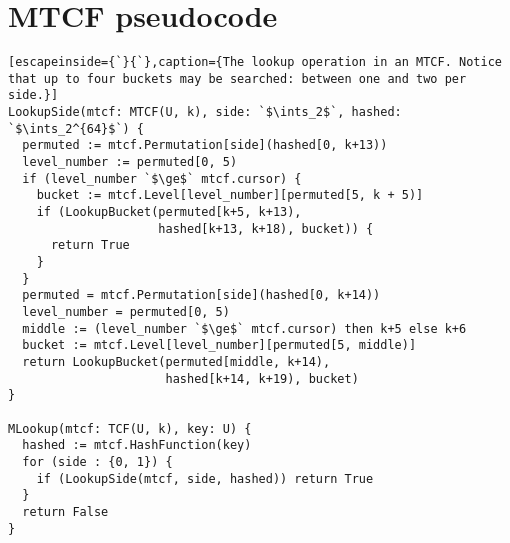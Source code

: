 \documentclass[sigconf, nonacm]{acmart}
\newcommand{\ints}{\mathbb{Z}}
\begin{document}


\pagebreak
\appendix
\section{MTCF pseudocode}
\label{mtcf-appendix}
 
\begin{lstlisting}[escapeinside={`}{`},caption={The lookup operation in an MTCF. Notice that up to four buckets may be searched: between one and two per side.}]
LookupSide(mtcf: MTCF(U, k), side: `$\ints_2$`, hashed: `$\ints_2^{64}$`) {
  permuted := mtcf.Permutation[side](hashed[0, k+13))
  level_number := permuted[0, 5)
  if (level_number `$\ge$` mtcf.cursor) {
    bucket := mtcf.Level[level_number][permuted[5, k + 5)]
    if (LookupBucket(permuted[k+5, k+13),
                     hashed[k+13, k+18), bucket)) {
      return True
    }
  }
  permuted = mtcf.Permutation[side](hashed[0, k+14))
  level_number = permuted[0, 5)
  middle := (level_number `$\ge$` mtcf.cursor) then k+5 else k+6
  bucket := mtcf.Level[level_number][permuted[5, middle)]
  return LookupBucket(permuted[middle, k+14),
                      hashed[k+14, k+19), bucket)
}

MLookup(mtcf: TCF(U, k), key: U) {
  hashed := mtcf.HashFunction(key)
  for (side : {0, 1}) {
    if (LookupSide(mtcf, side, hashed)) return True
  }
  return False
}
\end{lstlisting}

\end{document}
